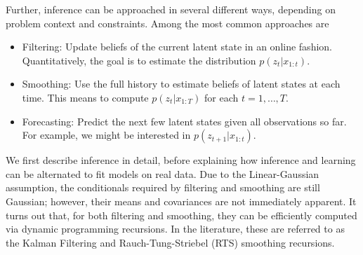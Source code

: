 \documentclass[14pt]{extreport}
\begin{document}
Further, inference can be approached in several different ways, depending on
problem context and constraints. Among the most common approaches are
\begin{itemize}
\item Filtering: Update beliefs of the current latent state in an online
  fashion. Quantitatively, the goal is to estimate the distribution
  $p\left(z_{t} \vert x_{1:t}\right)$.
\item Smoothing: Use the full history to estimate beliefs of latent states at
  each time. This means to compute $p\left(z_{t} \vert x_{1:T}\right)$ for each
  $t = 1, \dots, T$.
\item Forecasting: Predict the next few latent states given all observations so
  far. For example, we might be interested in $p\left(z_{t + 1} \vert
  x_{1:t}\right)$.
\end{itemize}

\begin{figure}
  \centering
  \caption{\label{fig:lds_graphical} }
\end{figure}

We first describe inference in detail, before explaining how inference and
learning can be alternated to fit models on real data. Due to the
Linear-Gaussian assumption, the conditionals required by filtering and smoothing
are still Gaussian; however, their means and covariances are not immediately
apparent. It turns out that, for both filtering and smoothing, they can be
efficiently computed via dynamic programming recursions. In the literature,
these are referred to as the Kalman Filtering and Rauch-Tung-Striebel (RTS)
smoothing recursions.
\end{document}
